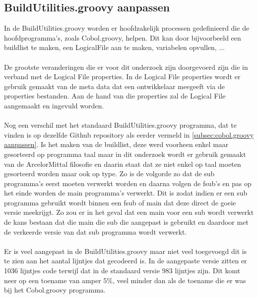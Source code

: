 \subsection{BuildUtilities.groovy aanpassen}
In de BuildUtilities.groovy worden er hoofdzakelijk processen gedefinieerd die de hoofdprogramma's, zoals Cobol.groovy, helpen. Dit kan door bijvoorbeeld een buildlist te maken, een LogicalFile aan te maken, variabelen opvullen, ...
\\ \\
De grootste veranderingen die er voor dit onderzoek zijn doorgevoerd zijn die in verband met de Logical File properties. In de Logical File properties wordt er gebruik gemaakt van de meta data dat een ontwikkelaar meegeeft via de properties bestanden. Aan de hand van die properties zal de Logical File aangemaakt en ingevuld worden.
\\ \\
Nog een verschil met het standaard BuildUtilities.groovy programma, dat te vinden is op dezelfde Github repository als eerder vermeld in \ref{subsec:cobol.groovy aanpassen}. Is het maken van de buildlist, deze werd voorheen enkel maar gesorteerd op programma taal maar in dit onderzoek wordt er gebruik gemaakt van de ArcelorMittal filosofie en daarin staat dat ze niet enkel op taal moeten gesorteerd worden maar ook op type. Zo is de volgorde zo dat de sub programma's eerst moeten verwerkt worden en daarna volgen de fsub's en pas op het einde worden de main programma's verwerkt. Dit is zodat indien er een sub programma gebruikt wordt binnen een fsub of main dat deze direct de goeie versie meekrijgt. Zo zou er in het geval dat een main voor een sub wordt verwerkt de kans bestaan dat die main die sub die aangepast is gebruikt en daardoor met de verkeerde versie van dat sub programma wordt verwerkt. 
\\ \\
Er is veel aangepast in de BuildUtilities.groovy maar niet veel toegevoegd dit is te zien aan het aantal lijntjes dat gecodeerd is. In de aangepaste versie zitten er 1036 lijntjes code terwijl dat in de standaard versie 983 lijntjes zijn. Dit komt neer op een toename van amper 5\%, veel minder dan als de toename die er was bij het Cobol.groovy programma. 

